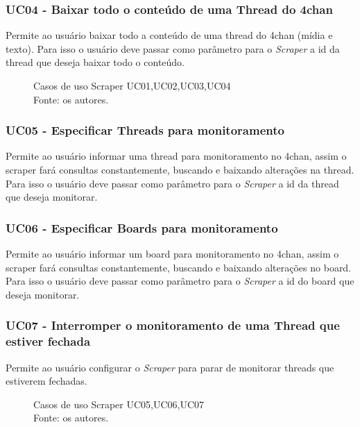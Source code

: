 \subsubsection{UC04 - Baixar todo o conteúdo de uma Thread do 4chan}
Permite ao usuário baixar todo a conteúdo de uma thread do 4chan (mídia e texto). Para isso o usuário deve passar como parâmetro para o \textit{Scraper} a id da thread que deseja baixar todo o conteúdo.
\begin{figure}[H]
    \centering
    
    \caption[Casos de uso Scraper UC01, UC02, UC03, e UC04]{\label{fig:Ator_Scraper1}
        Casos de uso Scraper UC01,UC02,UC03,UC04\\
        Fonte: os autores.
    }
\end{figure}
\subsubsection{UC05 - Especificar Threads para monitoramento}
Permite ao usuário informar uma thread para monitoramento no 4chan, assim o scraper fará consultas constantemente, buscando e baixando alterações na thread. Para isso o usuário deve passar como parâmetro para o \textit{Scraper} a id da thread que deseja monitorar.  
\subsubsection{UC06 - Especificar Boards para monitoramento}
Permite ao usuário informar um board para monitoramento no 4chan, assim o scraper fará consultas constantemente, buscando e baixando alterações no board. Para isso o usuário deve passar como parâmetro para o \textit{Scraper} a id do board que deseja monitorar.  
\subsubsection{UC07 - Interromper o monitoramento de uma Thread que estiver fechada}
Permite ao usuário configurar o \textit{Scraper} para parar de monitorar threads que estiverem fechadas.

\begin{figure}[H]
    \centering
    
    \caption[Casos de uso Scraper UC05,UC06,UC07]{\label{fig:Ator_Scraper2}
        Casos de uso Scraper UC05,UC06,UC07\\
        Fonte: os autores.
    }
\end{figure}

